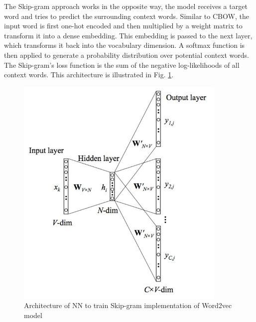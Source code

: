 The Skip-gram approach works in the opposite way, the model receives a target word and tries to predict the surrounding context words. Similar to CBOW, the input word is first one-hot encoded and then multiplied by a weight matrix to transform it into a dense embedding. This embedding is passed to the next layer, which transforms it back into the vocabulary dimension. A softmax function is then applied to generate a probability distribution over potential context words. The Skip-gram’s loss function is the sum of the negative log-likelihoods of all context words. This architecture is illustrated in Fig. \ref{fig:skip_arch}.

\begin{figure}[!h]
	\centering
	
	\includegraphics[width=0.9\textwidth]{images/Skip_arch.png}
	
	\caption{Architecture of NN to train Skip-gram implementation of Word2vec model \cite{skipgram}}
	\label{fig:skip_arch}
\end{figure}